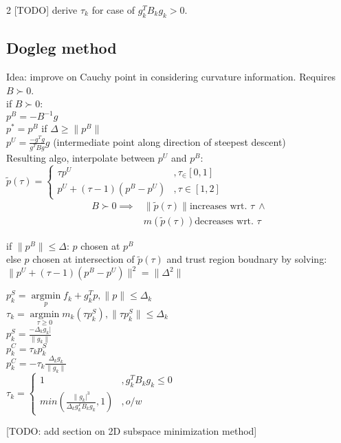 \documentclass[8pt,letter]{article}
\DeclareMathOperator*{\argmin}{argmin}
\newcommand*{\argminl}{\argmin\limits}
\begin{document}
\begin{multicols*}{2}
  [TODO] derive $\tau_k$ for case of $g_k^T B_k g_k > 0$.
  
  \subsection{Dogleg method}

  Idea: improve on Cauchy point in considering curvature information. Requires $B \succ 0$.\\
  
  if $B \succ 0$:\\
  $p^B=-B^{-1}g$\\
  $p^*=p^B$ if $\Delta \geq \|p^B\|$\\
  $p^U=\frac{-g^Tg}{g^TBg}g$ (intermediate point along direction of steepest descent)\\
  Resulting algo, interpolate between $p^U$ and $p^B$:\\
  $\tilde{p}(\tau) =
  \begin{cases}
    \tau p^U &, \tau_\in [0,1]\\
    p^U + (\tau-1)(p^B-p^U) &, \tau \in [1,2]
  \end{cases}
  $
  \begin{align*}
    B \succ 0 \implies & \|\tilde{p}(\tau)\| \text{increases wrt. }\tau\ \land\\
    & m(\tilde{p}(\tau)) \text{decreases wrt. } \tau
  \end{align*}
  
  if $\|p^B\| \leq \Delta$: $p$ chosen at $p^B$\\
  else $p$ chosen at intersection of $\tilde{p}(\tau)$ and trust region boudnary by solving:\\
  $\|p^U+(\tau-1)(p^B-p^U)\|^2 = \|\Delta^2\|$

  $p_k^S=\argminl_p f_k+g_k^Tp, \|p\| \leq \Delta_k$\\
  $\tau_k = \argminl_{\tau\geq0} m_k(\tau p_k^S), \|\tau p_k^S\| \leq \Delta_k$\\
  $p_k^S=\frac{-\Delta_k g_k|}{\|g_k\|}$\\
  $p_k^C=\tau_k p_k^S$\\
  $p_k^C=-\tau_k \frac{\Delta_k g_k}{\|g_k\|}$\\
  $\tau_k=\begin{cases}
  1 &, g_k^T B_k g_k \leq 0\\
  min(\frac{\|g_k|^3}{\Delta_k g_k^T B_k g_k}, 1) &, o/w
  \end{cases}$

  [TODO: add section on 2D subspace minimization method]\\
  

\end{multicols*}
\end{document}
